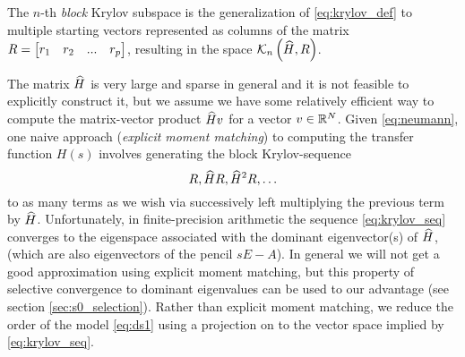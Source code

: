 \documentclass[letterpaper]{article}
\theoremstyle{remark}
\begin{document}
\begin{description}
      
      The $n$-th \emph{block} Krylov subspace is the generalization of 
      \eqref{eq:krylov_def}
      to multiple starting vectors represented as columns of the matrix 
   $R = \begin{bmatrix} r_1&r_2&...&r_p\end{bmatrix}$, resulting in the space $\mathcal{K}_{n}\left({\widehat{H}},{R} \right)$.
   
   The matrix $\widehat{H}$ is very large and sparse in general and it is not feasible to
   explicitly construct it, but we assume we have some relatively efficient way
   to compute
   the matrix-vector product $\widehat{H} v$ for a 
   vector 
   $v\in\mathbb{R}^N$. Given \eqref{eq:neumann}, one naive approach 
   (\emph{explicit moment matching})
   to computing the transfer function $H(s)$ involves generating the 
   block Krylov-sequence
   \begin{equation}
		R, \widehat{H} R,\widehat{H}^2R,\ldots
	\label{eq:krylov_seq}
   \end{equation}
   to as many terms as we wish via successively left multiplying the previous term by
   $\widehat{H}$. 
   Unfortunately, in finite-precision arithmetic the sequence 
   \eqref{eq:krylov_seq} converges to the eigenspace associated with the dominant 
   eigenvector(s)
   of $\widehat{H}$, (which are also eigenvectors of the pencil $sE-A$). 
   In general we will not get a good approximation using explicit moment matching,
   but 
   this property of selective convergence to dominant eigenvalues can be used  
   to our advantage (see section \ref{sec:s0_selection}). Rather than explicit 
   moment
   matching, we reduce the order of the model \eqref{eq:ds1} using a projection 
   on to the vector space implied by \eqref{eq:krylov_seq}.

   


\end{description}
\end{document}

